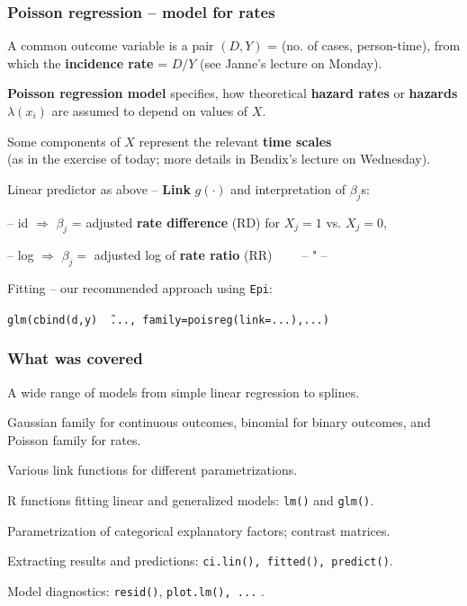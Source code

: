 \documentclass[12pt,dvipsnames,t,handout%
,aspectratio=169%
]{beamer}
\begin{document}
\begin{frame}
\frametitle{Poisson regression -- model for rates}
\bi
\item
A common outcome variable is
a pair $(D, Y)$ = (no. of cases, person-time), from
which the \textbf{incidence rate} = $D/Y$ 
(see Janne's lecture on Monday).
\medskip
\item
\textbf{Poisson regression model} specifies, how theoretical
{\bf hazard rates}
or \textbf{hazards} $\lambda(x_i)$ are assumed 
to depend on values of $X$.
\medskip
\item
Some components of $X$ represent the relevant \textbf{time scales} \\
(as in the exercise of today; 
more details in Bendix's lecture on Wednesday).
\medskip
\item
Linear predictor as above -- 
\textbf{Link} $g(\cdot)$ and interpretation of $\beta_j$s:
\bi
{\normalsize 
\item[--]  id $\Rightarrow$ $\beta_j$ = 
adjusted \textbf{rate difference} (RD)  for $X_j=1$ vs. $X_j=0$,
\item[--] log $\Rightarrow$ $\beta_j=$ 
adjusted log of \textbf{rate ratio} (RR) \ \ \ \ -- " --
}
\ei
\medskip
\item
Fitting -- our recommended approach using \texttt{Epi}:
\begin{center}
\texttt{glm(cbind(d,y) \~\ ..., family=poisreg(link=...),...)}
\end{center}

\ei

\end{frame}


% 
\begin{frame}
\frametitle{What was covered}

\bi
\item A wide range of models from simple linear regression to splines.
\medskip
\item
Gaussian family for continuous outcomes, binomial for binary outcomes,
and Poisson family for rates.
\medskip
\item
Various link functions for different parametrizations. 
\medskip
\item
R functions fitting linear and generalized models: 
\texttt{lm()} and \texttt{glm()}.
\medskip
\item
Parametrization of categorical explanatory factors; contrast matrices.
\medskip
\item
Extracting results and predictions: \texttt{ci.lin(), fitted(), predict()}. 
\medskip
\item
Model diagnostics:  \texttt{resid()}, \texttt{plot.lm(), ...} .
\ei

\end{frame}
\end{document}
